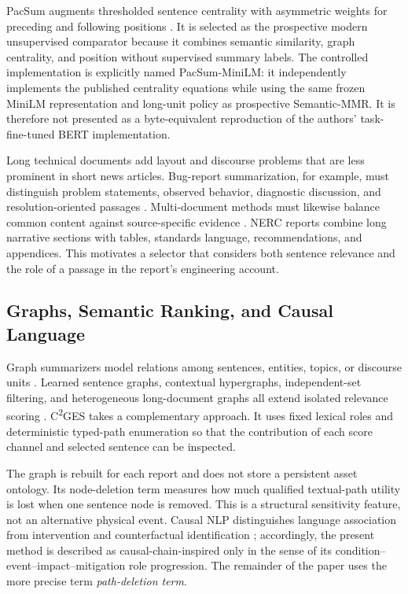 \documentclass[applsci,article,submit,moreauthors]{Definitions/mdpi}
\newcommand{\cges}{C\textsuperscript{2}GES}
\begin{document}
PacSum augments thresholded sentence centrality with asymmetric weights for preceding and following positions \cite{zheng2019pacsum}. It is selected as the prospective modern unsupervised comparator because it combines semantic similarity, graph centrality, and position without supervised summary labels. The controlled implementation is explicitly named PacSum-MiniLM: it independently implements the published centrality equations while using the same frozen MiniLM representation and long-unit policy as prospective Semantic-MMR. It is therefore not presented as a byte-equivalent reproduction of the authors' task-fine-tuned BERT implementation.

Long technical documents add layout and discourse problems that are less prominent in short news articles. Bug-report summarization, for example, must distinguish problem statements, observed behavior, diagnostic discussion, and resolution-oriented passages \cite{koh2022bugreport}. Multi-document methods must likewise balance common content against source-specific evidence \cite{zhang2024tomds}. NERC reports combine long narrative sections with tables, standards language, recommendations, and appendices. This motivates a selector that considers both sentence relevance and the role of a passage in the report's engineering account.

\subsection{Graphs, Semantic Ranking, and Causal Language}

Graph summarizers model relations among sentences, entities, topics, or discourse units \cite{wang2020heterogeneous,cui2020enhancing,jing2021multiplex}. Learned sentence graphs, contextual hypergraphs, independent-set filtering, and heterogeneous long-document graphs all extend isolated relevance scoring \cite{siragusa2022sentencegraph,onan2024mches,hark2025mis,bugueno2025graphlss}. \cges{} takes a complementary approach. It uses fixed lexical roles and deterministic typed-path enumeration so that the contribution of each score channel and selected sentence can be inspected.

The graph is rebuilt for each report and does not store a persistent asset ontology. Its node-deletion term measures how much qualified textual-path utility is lost when one sentence node is removed. This is a structural sensitivity feature, not an alternative physical event. Causal NLP distinguishes language association from intervention and counterfactual identification \cite{feder2022causal,du2022ecare}; accordingly, the present method is described as causal-chain-inspired only in the sense of its condition--event--impact--mitigation role progression. The remainder of the paper uses the more precise term \emph{path-deletion term}.
\end{document}
